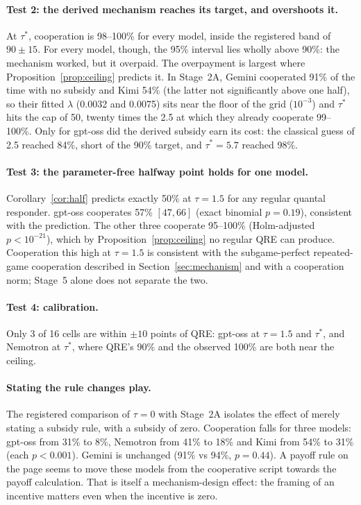 \documentclass[10pt]{article}
\theoremstyle{definition}
\theoremstyle{remark}
\newcommand{\lam}{\lambda}
\begin{document}
\paragraph{Test 2: the derived mechanism reaches its target, and overshoots it.} At $\tau^*$,
cooperation is 98--100\% for every model, inside the registered band of $90\pm15$. For every
model, though, the 95\% interval lies wholly above 90\%: the mechanism worked, but it overpaid.
The overpayment is largest where Proposition~\ref{prop:ceiling} predicts it. In Stage~2A,
Gemini cooperated 91\% of the time with no subsidy and Kimi 54\% (the latter not significantly
above one half), so their fitted $\lam$ (0.0032 and 0.0075) sits near the floor of the grid
($10^{-3}$) and $\tau^*$ hits the cap of 50, twenty times the 2.5 at which they already cooperate
99--100\%. Only for gpt-oss did the derived subsidy earn its cost: the classical guess of 2.5
reached 84\%, short of the 90\% target, and $\tau^*=5.7$ reached 98\%.

\paragraph{Test 3: the parameter-free halfway point holds for one model.} Corollary~\ref{cor:half}
predicts exactly 50\% at $\tau=1.5$ for any regular quantal responder. gpt-oss cooperates 57\%
$[47,66]$ (exact binomial $p=0.19$), consistent with the prediction. The other three cooperate
95--100\% (Holm-adjusted $p<10^{-21}$), which by Proposition~\ref{prop:ceiling} no regular QRE
can produce. Cooperation this high at $\tau=1.5$ is consistent with the subgame-perfect
repeated-game cooperation described in Section~\ref{sec:mechanism} and with a cooperation norm;
Stage~5 alone does not separate the two.

\paragraph{Test 4: calibration.} Only 3 of 16 cells are within $\pm10$ points of QRE: gpt-oss at
$\tau=1.5$ and $\tau^*$, and Nemotron at $\tau^*$, where QRE's 90\% and the observed 100\% are
both near the ceiling.

\paragraph{Stating the rule changes play.} The registered comparison of $\tau=0$ with Stage~2A
isolates the effect of merely stating a subsidy rule, with a subsidy of zero. Cooperation falls
for three models: gpt-oss from 31\% to 8\%, Nemotron from 41\% to 18\% and Kimi from 54\% to
31\% (each $p<0.001$). Gemini is unchanged (91\% vs 94\%, $p=0.44$). A payoff rule on the page
seems to move these models from the cooperative script towards the payoff calculation. That is
itself a mechanism-design effect: the framing of an incentive matters even when the incentive is
zero.
\end{document}
